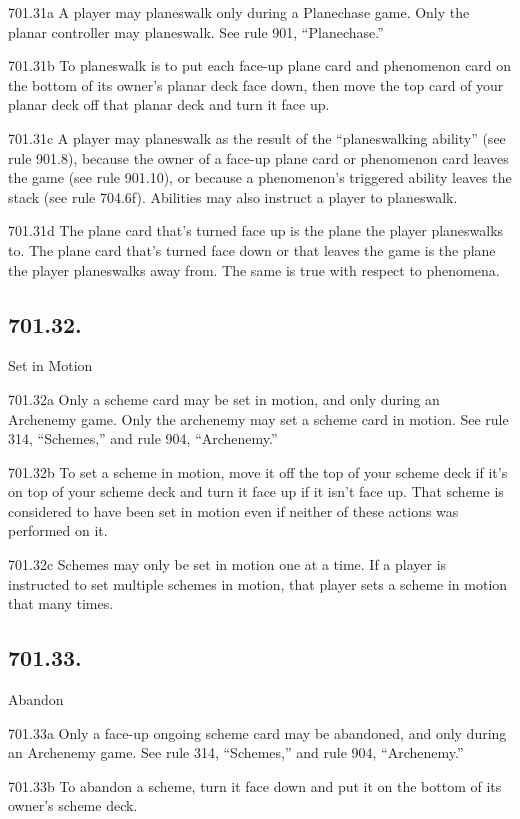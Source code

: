 701.31a A player may planeswalk only during a Planechase game. Only the planar controller may planeswalk. See rule 901, “Planechase.”

701.31b To planeswalk is to put each face-up plane card and phenomenon card on the bottom of its owner’s planar deck face down, then move the top card of your planar deck off that planar deck and turn it face up.

701.31c A player may planeswalk as the result of the “planeswalking ability” (see rule 901.8), because the owner of a face-up plane card or phenomenon card leaves the game (see rule 901.10), or because a phenomenon’s triggered ability leaves the stack (see rule 704.6f). Abilities may also instruct a player to planeswalk.

701.31d The plane card that’s turned face up is the plane the player planeswalks to. The plane card that’s turned face down or that leaves the game is the plane the player planeswalks away from. The same is true with respect to phenomena.

\subsection*{701.32.}
Set in Motion

701.32a Only a scheme card may be set in motion, and only during an Archenemy game. Only the archenemy may set a scheme card in motion. See rule 314, “Schemes,” and rule 904, “Archenemy.”

701.32b To set a scheme in motion, move it off the top of your scheme deck if it’s on top of your scheme deck and turn it face up if it isn’t face up. That scheme is considered to have been set in motion even if neither of these actions was performed on it.

701.32c Schemes may only be set in motion one at a time. If a player is instructed to set multiple schemes in motion, that player sets a scheme in motion that many times.

\subsection*{701.33.}
Abandon

701.33a Only a face-up ongoing scheme card may be abandoned, and only during an Archenemy game. See rule 314, “Schemes,” and rule 904, “Archenemy.”

701.33b To abandon a scheme, turn it face down and put it on the bottom of its owner’s scheme deck.

